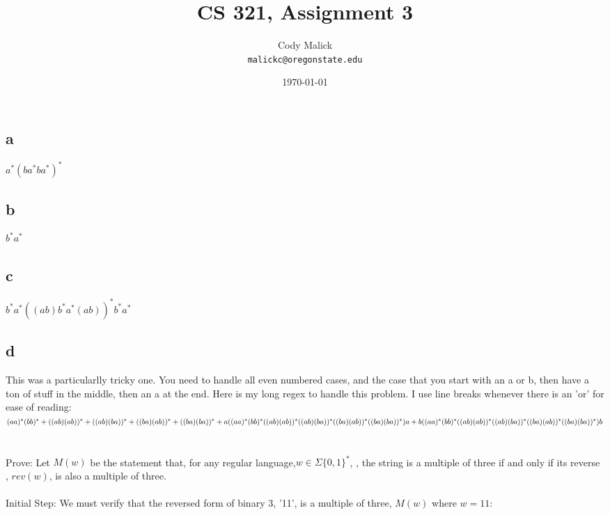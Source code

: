 \documentclass[10pt,letterpaper]{article}
\begin{document}
  \title{CS 321, Assignment 3}
  \author{Cody Malick\\
  \texttt{malickc@oregonstate.edu}}
  \date{\today}
  \maketitle

\section{}
\subsection*{a}
$a^*(ba^*ba^*)^*$
\subsection*{b}
$b^*a^*$
\subsection*{c}
$b^*a^*((ab)b^*a^*(ab))^*b^*a^*$
\subsection*{d}
This was a particularlly tricky one. You need to handle all even numbered cases,
and the case that you start with an a or b, then have a ton of stuff in the
middle, then an a at the end. Here is my long regex to handle this problem. I
use line breaks whenever there is an 'or' for ease of reading:\\
$(aa)^*(bb)^*+\\
((ab)(ab))^*+\\
((ab)(ba))^*+\\
((ba)(ab))^*+\\
((ba)(ba))^*+\\
a((aa)^*(bb)^*((ab)(ab))^*((ab)(ba))^*((ba)(ab))^*((ba)(ba))^*)a+\\
b((aa)^*(bb)^*((ab)(ab))^*((ab)(ba))^*((ba)(ab))^*((ba)(ba))^*)b$
\section{}
Prove: Let $M(w)$ be the statement that, for any regular language,$w \in \Sigma\{0,1\}^*$,
, the string is a multiple of three if and only if its reverse
, $rev(w)$, is also a multiple of three.\\\\

Initial Step: We must verify that the reversed form of binary 3, '11', is a
multiple of three, $M(w)$ where $w=11$: \\
\end{document}

